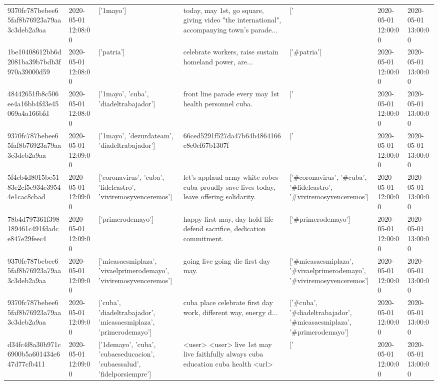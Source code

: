 \begin{tabular}{lllllll}
9370fc787bebee65faf8b76923a79aa3c3deb2a9aa & 2020-05-01 12:08:00 & ['1mayo'] & today, may 1st, go square, giving video "the international", accompanying town's parade... & ['#1mayo'] & 2020-05-01 12:00:00 & 2020-05-01 13:00:00 \\
1be10408612bb6d2081ba39b7bdb3f970a39000d59 & 2020-05-01 12:08:00 & ['patria'] & celebrate workers, raise sustain homeland power, are... & ['#patria'] & 2020-05-01 12:00:00 & 2020-05-01 13:00:00 \\
48442651fb8c506ee4a16bb4fd3e45069a4a166bfd & 2020-05-01 12:08:00 & ['1mayo', 'cuba', 'diadeltrabajador'] & front line parade every may 1st health personnel cuba. & ['#1mayo', '#cuba', '#diadeltrabajador'] & 2020-05-01 12:00:00 & 2020-05-01 13:00:00 \\
9370fc787bebee65faf8b76923a79aa3c3deb2a9aa & 2020-05-01 12:09:00 & ['1mayo', 'dezurdateam', 'díadeltrabajador'] & 66ced5291f527da47b64b4864166c8e0cf67b1307f & ['#1mayo', '#dezurdateam', '#díadeltrabajador'] & 2020-05-01 12:00:00 & 2020-05-01 13:00:00 \\
5f4cb4d8015be5183e2cf5e934e39544e1cac8cbad & 2020-05-01 12:09:00 & ['coronavirus', 'cuba', 'fidelcastro', 'viviremosyvenceremos'] & let's applaud army white robes cuba proudly save lives today, leave offering solidarity. & ['#coronavirus', '#cuba', '#fidelcastro', '#viviremosyvenceremos'] & 2020-05-01 12:00:00 & 2020-05-01 13:00:00 \\
78b4d797361f398189461c491fdadce847e29feec4 & 2020-05-01 12:09:00 & ['primerodemayo'] & happy first may, day hold life defend sacrifice, dedication commitment. & ['#primerodemayo'] & 2020-05-01 12:00:00 & 2020-05-01 13:00:00 \\
9370fc787bebee65faf8b76923a79aa3c3deb2a9aa & 2020-05-01 12:09:00 & ['micasaesmiplaza', 'vivaelprimerodemayo', 'viviremosyvenceremos'] & going live going die first day may. & ['#micasaesmiplaza', '#vivaelprimerodemayo', '#viviremosyvenceremos'] & 2020-05-01 12:00:00 & 2020-05-01 13:00:00 \\
9370fc787bebee65faf8b76923a79aa3c3deb2a9aa & 2020-05-01 12:09:00 & ['cuba', 'diadeltrabajador', 'micasaesmiplaza', 'primerodemayo'] & cuba place celebrate first day work, different way, energy d... & ['#cuba', '#diadeltrabajador', '#micasaesmiplaza', '#primerodemayo'] & 2020-05-01 12:00:00 & 2020-05-01 13:00:00 \\
d34fc4f8a30b971c6900b5a601434e647d77cfb411 & 2020-05-01 12:09:00 & ['1demayo', 'cuba', 'cubaeseducacion', 'cubaessalud', 'fidelporsiempre'] & <user> <user> live 1st may live faithfully always cuba education cuba health <url> & ['#1demayo', '#cuba', '#fidelporsiempre'] & 2020-05-01 12:00:00 & 2020-05-01 13:00:00 \\

\end{tabular}
